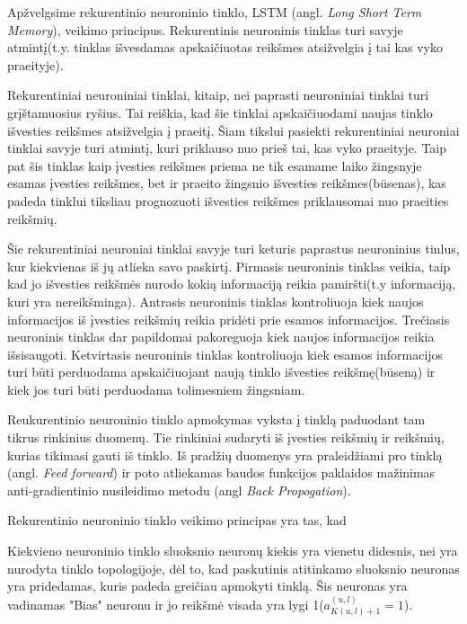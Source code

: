 Apžvelgsime rekurentinio neuroninio tinklo, LSTM (angl. \textit{Long Short Term Memory}), veikimo principus.
Rekurentinis neuroninis tinklas turi savyje atmintį(t.y. tinklas išvesdamas apskaičiuotas reikšmes atsižvelgia į tai kas vyko praeityje).

Rekurentiniai neuroniniai tinklai, kitaip, nei paprasti neuroniniai tinklai turi grįštamuosius ryšius. Tai reiškia, kad šie tinklai apskaičiuodami naujas tinklo išvesties reikšmes atsižvelgia į praeitį. Šiam tikslui pasiekti rekurentiniai neuroniai tinklai savyje turi atmintį, kuri priklauso nuo prieš tai, kas vyko praeityje. Taip pat šis tinklas kaip įvesties reikšmes priema ne tik esamame laiko žingsnyje esamas įvesties reikšmes, bet ir praeito žingsnio išvesties reikšmes(būsenas), kas padeda tinklui tiksliau prognozuoti išvesties reikšmes priklausomai nuo praeities reikšmių.

Šie rekurentiniai neuroniai tinklai savyje turi keturis paprastus neuroninius tinlus, kur kiekvienas iš jų atlieka savo paskirtį. Pirmasis neuroninis tinklas veikia, taip kad jo išvesties reikšmės nurodo kokią informaciją reikia pamiršti(t.y informaciją, kuri yra nereikšminga). Antrasis neuroninis tinklas kontroliuoja kiek naujos informacijos iš įvesties reikšmių reikia pridėti prie esamos informacijos. Trečiasis neuroninis tinklas dar papildomai pakoreguoja kiek naujos informacijos reikia išsisaugoti. Ketvirtasis neuroninis tinklas kontroliuoja kiek esamos informacijos turi būti perduodama apskaičiuojant naują tinklo išvesties reikšmę(būseną) ir kiek jos turi būti perduodama tolimesniem žingsniam.

Reukurentinio neuroninio tinklo apmokymas vyksta į tinklą paduodant tam tikrus rinkinius duomenų. Tie rinkiniai sudaryti iš įvesties reikšmių ir reikšmių, kurias tikimasi gauti iš tinklo. Iš pradžių duomenys yra praleidžiami pro tinklą (angl. \textit{Feed forward}) ir poto atliekamas baudos funkcijos paklaidos mažinimas anti-gradientinio nusileidimo metodu (angl \textit{Back Propogation}).

Rekurentinio neuroninio tinklo veikimo principas yra tas, kad


Kiekvieno neuroninio tinklo sluoksnio neuronų kiekis yra vienetu didesnis, nei yra nurodyta tinklo topologijoje, dėl to, kad paskutinis atitinkamo sluoksnio neuronas yra pridedamas, kuris padeda greičiau apmokyti tinklą. Šis neuronas yra vadinamas "Bias" neuronu ir jo reikšmė visada yra lygi 1(\begin{math}a_{K(u,l)+1}^{(u,l)}=1\end{math}).

